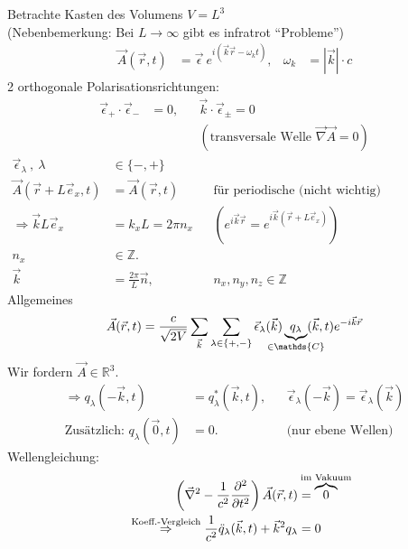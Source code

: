 	Betrachte Kasten des Volumens $V = L^3$ \\	
	(Nebenbemerkung: Bei $L \rightarrow \infty$ gibt es infratrot ``Probleme'')
		\begin{align*}
			\vec{A} (\vec{r} , t) &= \vec{\epsilon}~ e^{i (\vec{k} \vec{r} - \omega_k t)} 
			,& \omega_k &= |\vec{k}| \cdot c 
		\end{align*}
	2 orthogonale Polarisationsrichtungen: 
		\begin{align*}
			\vec{\epsilon}_+ \cdot \vec{\epsilon}_- &= 0 
			,& &\vec{k} \cdot \vec{\epsilon}_\pm = 0 \\
			& & &(\text{transversale Welle~} \vec{\nabla} \vec{A} = 0 )
 		\end{align*}
 		\begin{align*}
	 		\vec{\epsilon}_\lambda ~,~ \lambda &\in \{ - , + \} \\
	 		\vec{A} (\vec{r} + L \vec{e}_x , t) &= \vec{A} (\vec{r} , t) &
	 		&\text{für periodische (nicht wichtig) Randbedingungen.} \\
	 		\Rightarrow \vec{k} L \vec{e}_x &= k_x L = 2 \pi n_x &
	 		&\left( e^{i \vec{k} \vec{r}} = e^{i \vec{k} (\vec{r} + L \vec{e}_x)} \right) \\
	 		n_x &\in \mathds{Z}. \\
	 		\vec{k} &= \frac{2 \pi}{L} \vec{n} ,& &n_x, n_y, n_z \in \mathds{Z}
 		\end{align*}
 	Allgemeines
	 	\begin{align*}
		 	\vec{A} (\vec{r} , t) = \frac{c}{\sqrt{2 V}}
		 	\sum_{\vec{k}} \sum_{\lambda \in \{+ , - \} }
		 	\vec{\epsilon}_\lambda (\vec{k}) 
		 	\underbrace{q_\lambda}_{\mathclap{\in \mathds{C}}} (\vec{k} , t) 
		 	e^{-i \vec{k} \vec{r}}
	 	\end{align*}
	Wir fordern $\vec{A} \in \mathds{R}^3$.
		\begin{align*}
			\Rightarrow q_\lambda (- \vec{k} , t) &= q^*_\lambda (\vec{k} , t) ,&
			&\vec{\epsilon}_\lambda (-\vec{k}) = \vec{\epsilon}_\lambda (\vec{k}) \\
			\text{Zusätzlich:~} q_\lambda (\vec{0} , t) &= 0 .& 
			&\text{(nur ebene Wellen)}
		\end{align*}
	Wellengleichung: 
		\begin{align*}
			\left(
				\vec{\nabla}^2 - \frac{1}{c^2} \frac{\partial^2}{\partial t^2} 
			\right)
			\vec{A} (\vec{r} , t) &= \overbrace{0}^{\mathclap{\text{im Vakuum}}} \\
			\overset{\text{Koeff.-Vergleich}}{\Rightarrow} 
			\frac{1}{c^2} \ddot{q}_\lambda (\vec{k} , t) + \vec{k}^2 q_\lambda &= 0
		\end{align*}

